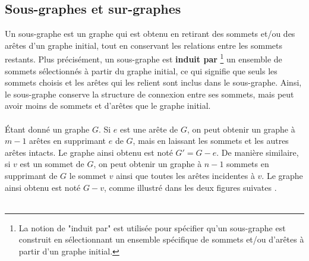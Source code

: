\documentclass[hidelinks,letterpaper,12pt]{article}
\begin{document}
\subsection{Sous-graphes et sur-graphes}
\label{Sous-graphes et sur-graphes}
Un sous-graphe est un graphe qui est obtenu en retirant des sommets et/ou des arêtes d'un graphe initial, tout en conservant les relations entre les sommets restants. Plus précisément, un sous-graphe est \textbf{induit par} \footnote{La notion de "induit par" est utilisée pour spécifier qu'un sous-graphe est construit en sélectionnant un ensemble spécifique de sommets et/ou d'arêtes à partir d'un graphe initial.\label{refnote3}}  un ensemble de sommets sélectionnés à partir du graphe initial, ce qui signifie que seuls les sommets choisis et les arêtes qui les relient sont inclus dans le sous-graphe. Ainsi, le sous-graphe conserve la structure de connexion entre ses sommets, mais peut avoir moins de sommets et d'arêtes que le graphe initial.
\\ \\
Étant donné un graphe $G$. Si $e$ est une arête de $G$, on peut obtenir un graphe à $m−1$ arêtes en supprimant $e$ de $G$, mais en laissant les sommets et les autres arêtes intacts. Le graphe ainsi obtenu est noté $G'=G-e$. De manière similaire, si $v$ est un sommet de $G$, on peut obtenir un graphe à $n−1$ sommets en supprimant de $G$ le sommet $v$ ainsi que toutes les arêtes incidentes à $v$. Le graphe ainsi obtenu est noté $G−v$, comme illustré dans les deux figures suivates \citep{Bondy-Murty}.
\\ \\
\end{document}
